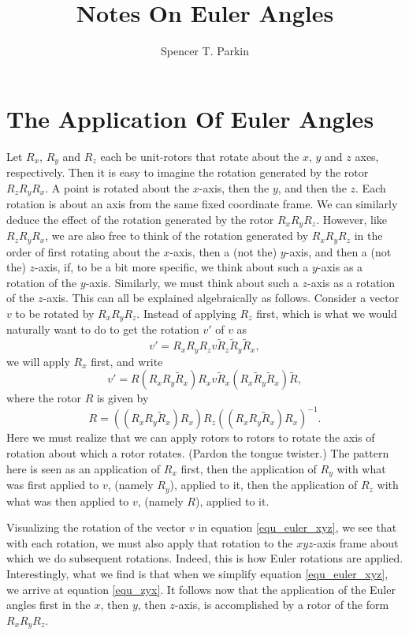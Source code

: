 \documentclass[12pt]{article}
\title{Notes On Euler Angles}
\author{Spencer T. Parkin}
\begin{document}
\maketitle

\section*{The Application Of Euler Angles}

Let $R_x$, $R_y$ and $R_z$ each be unit-rotors that rotate about the $x$, $y$ and $z$ axes, respectively.
Then it is easy to imagine the rotation generated by the rotor $R_zR_yR_x$.
A point is rotated about the $x$-axis, then the $y$, and then the $z$.  Each rotation is about
an axis from the same fixed coordinate frame.  We can similarly deduce the effect of the rotation generated by the
rotor $R_xR_yR_z$.  However, like $R_zR_yR_x$, we are also free to think of the rotation generated by
$R_xR_yR_z$ in the order of first rotating about the $x$-axis, then a (not the) $y$-axis, and then
a (not the) $z$-axis, if, to be a bit more specific, we think about such a $y$-axis as a rotation of the $y$-axis.
Similarly, we must think about such a $z$-axis as a rotation of the $z$-axis.  This can all be explained
algebraically as follows.  Consider a vector $v$ to be rotated by $R_xR_yR_z$.  Instead of applying $R_z$
first, which is what we would naturally want to do to get the rotation $v'$ of $v$ as
\begin{equation}\label{equ_zyx}
v' = R_xR_yR_z v \tilde{R}_z\tilde{R}_y\tilde{R}_x,
\end{equation}
we will apply $R_x$ first, and write
\begin{equation}\label{equ_euler_xyz}
v' = R(R_x R_y \tilde{R}_x)R_x v \tilde{R}_x(R_x \tilde{R}_y \tilde{R}_x)\tilde{R},
\end{equation}
where the rotor $R$ is given by
\begin{equation*}
R = ((R_xR_y\tilde{R}_x)R_x)R_z((R_xR_y\tilde{R}_x)R_x)^{-1}.
\end{equation*}
Here we must realize that we can apply rotors to rotors to rotate the axis of rotation
about which a rotor rotates.  (Pardon the tongue twister.)  The pattern here is seen as an application of $R_x$ first,
then the application of $R_y$ with what was first applied to $v$, (namely $R_y$), applied to it,
then the application of $R_z$ with what was then applied to $v$, (namely $R$), applied to it.

Visualizing the rotation of the vector $v$ in equation \eqref{equ_euler_xyz}, we see that
with each rotation, we must also apply that rotation to the $xyz$-axis frame about which we do subsequent rotations.
Indeed, this is how Euler rotations are applied.  Interestingly, what we find is that when we
simplify equation \eqref{equ_euler_xyz}, we arrive at equation \eqref{equ_zyx}.
It follows now that the application of the Euler angles first in the $x$, then $y$, then $z$-axis,
is accomplished by a rotor of the form $R_xR_yR_z$.
\end{document}
